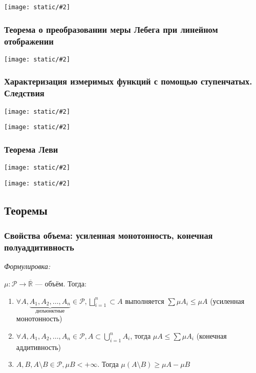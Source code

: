\documentclass{article}
\def\images#1#2{\begin{center}\texttt{[image: static/\#2]}\end{center}}
\begin{document}
\images{0.95}{reg_mer_leb.jpg}

\subsubsection{Теорема о преобразовании меры Лебега при линейном отображении}

\images{0.95}{iz_lin_otob.jpg}

\subsubsection{Характеризация измеримых функций с помощью ступенчатых. Следствия}

\images{0.95}{harakt_iz_st_1.jpg}

\images{1}{harakt_iz_st_2.jpg}

\subsubsection{Теорема Леви}

\images{0.95}{t_levi_1.jpg}

\images{1}{t_levi_2.jpg}


\newpage

\subsection{Теоремы}

\subsubsection{Свойства объема: усиленная монотонность, конечная полуаддитивность}

\textit{Формулировка:}

$\mu: \mathcal{P} \rightarrow \overline{\mathbb{R}}$ --- объём. Тогда: 

\begin{enumerate}
    \item $\forall A, \underbrace{A_1, A_2, \ldots, A_n}_{\text{дизъюнктные}} \in \mathcal{P}, \bigsqcup_{i = 1}^{n} \subset A$ выполняется $\sum \mu A_i \le \mu A$ (усиленная монотонность)
    \item $\forall A, A_1, A_2, \ldots, A_n \in \mathcal{P}, A \subset \bigcup_{i = 1}^{n} A_i$, тогда $\mu A \le \sum \mu A_i$ (конечная аддитивность)
    \item $A, B, A \setminus B \in \mathcal{P}, \mu B < +\infty$. Тогда $\mu(A \setminus B) \ge \mu A - \mu B$
\end{enumerate}
\end{document}
